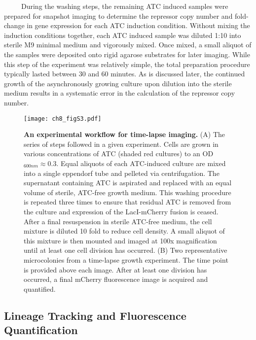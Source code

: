 \documentclass[12pt]{caltech_thesis}
\begin{document}
~~~~~During the washing steps, the remaining ATC induced samples were
prepared for snapshot imaging to determine the repressor copy number and
fold-change in gene expression for each ATC induction condition. Without
mixing the induction conditions together, each ATC induced sample was
diluted 1:10 into sterile M9 minimal medium and vigorously mixed. Once
mixed, a small aliquot of the samples were deposited onto rigid agarose
substrates for later imaging. While this step of the experiment was
relatively simple, the total preparation procedure typically lasted
between 30 and 60 minutes. As is discussed later, the continued growth
of the asynchronously growing culture upon dilution into the sterile
medium results in a systematic error in the calculation of the repressor
copy number.

\hypertarget{fig:growth_si_microscopy_workflow}{%
\begin{figure}
\centering
\texttt{[image: ch8\_figS3.pdf]}
\caption[{An experimental workflow for determination of a fluorescence
calibration factor.}]{\textbf{An experimental workflow for time-lapse
imaging.} (A) The series of steps followed in a given experiment. Cells
are grown in various concentrations of ATC (shaded red cultures) to an
OD\(_{600nm} \approx 0.3\). Equal aliquots of each ATC-induced culture
are mixed into a single eppendorf tube and pelleted via centrifugation.
The supernatant containing ATC is aspirated and replaced with an equal
volume of sterile, ATC-free growth medium. This washing procedure is
repeated three times to ensure that residual ATC is removed from the
culture and expression of the LacI-mCherry fusion is ceased. After a
final resuspension in sterile ATC-free medium, the cell mixture is
diluted 10 fold to reduce cell density. A small aliquot of this mixture
is then mounted and imaged at 100x magnification until at least one cell
division has occurred. (B) Two representative microcolonies from a
time-lapse growth experiment. The time point is provided above each
image. After at least one division has occurred, a final mCherry
fluorescence image is acquired and quantified.}
\label{fig:growth_si_microscopy_workflow}
\end{figure}
}

\hypertarget{lineage-tracking-and-fluorescence-quantification}{%
\subsection{Lineage Tracking and Fluorescence
Quantification}\label{lineage-tracking-and-fluorescence-quantification}}
\end{document}
